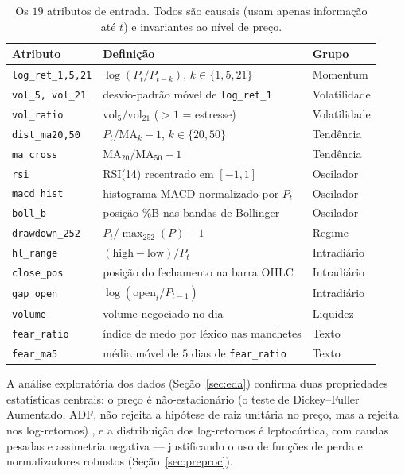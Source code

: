\documentclass[12pt]{article}
\begin{document}
\begin{table}[H]
  \caption{Os $19$ atributos de entrada. Todos são causais (usam apenas
    informação até $t$) e invariantes ao nível de preço.}
  \label{tab:features}
  \centering
  \small
  \begin{tabular}{lll}
    \toprule
    Atributo & Definição & Grupo \\
    \midrule
    \texttt{log\_ret\_1,5,21} & $\log(P_t/P_{t-k})$, $k\in\{1,5,21\}$ & Momentum \\
    \texttt{vol\_5, vol\_21}  & desvio-padrão móvel de \texttt{log\_ret\_1} & Volatilidade \\
    \texttt{vol\_ratio}       & $\mathrm{vol}_5/\mathrm{vol}_{21}$ ($>1$ = estresse) & Volatilidade \\
    \texttt{dist\_ma20,50}    & $P_t/\mathrm{MA}_k - 1$, $k\in\{20,50\}$ & Tendência \\
    \texttt{ma\_cross}        & $\mathrm{MA}_{20}/\mathrm{MA}_{50} - 1$ & Tendência \\
    \texttt{rsi}              & RSI(14) recentrado em $[-1,1]$ & Oscilador \\
    \texttt{macd\_hist}       & histograma MACD normalizado por $P_t$ & Oscilador \\
    \texttt{boll\_b}          & posição \%B nas bandas de Bollinger & Oscilador \\
    \texttt{drawdown\_252}    & $P_t/\max_{252}(P) - 1$ & Regime \\
    \texttt{hl\_range}        & $(\mathrm{high}-\mathrm{low})/P_t$ & Intradiário \\
    \texttt{close\_pos}       & posição do fechamento na barra OHLC & Intradiário \\
    \texttt{gap\_open}        & $\log(\mathrm{open}_t/P_{t-1})$ & Intradiário \\
    \texttt{volume}           & volume negociado no dia & Liquidez \\
    \texttt{fear\_ratio}      & índice de medo por léxico nas manchetes & Texto \\
    \texttt{fear\_ma5}        & média móvel de $5$ dias de \texttt{fear\_ratio} & Texto \\
    \bottomrule
  \end{tabular}
\end{table}

A análise exploratória dos dados (Seção~\ref{sec:eda}) confirma duas
propriedades estatísticas centrais: o preço é não-estacionário (o teste de
Dickey--Fuller Aumentado, ADF, não rejeita a hipótese de raiz unitária no
preço, mas a rejeita nos log-retornos) \cite{dickeyfuller1979}, e a
distribuição dos log-retornos é leptocúrtica, com caudas pesadas e assimetria
negativa --- justificando o uso de funções de perda e normalizadores robustos
(Seção~\ref{sec:preproc}).
\end{document}
